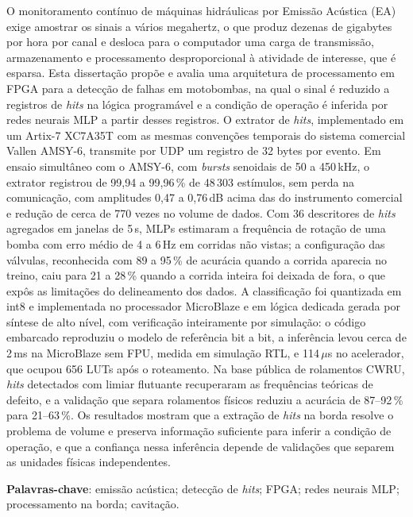 \documentclass[
	12pt,				%
	oneside,
	a4paper,			%
	english,			%
	french,				%
	spanish,			%
	brazil				%
	]{abntex2}
\begin{document}
\setlength{\absparsep}{18pt} %
\begin{resumo}
O monitoramento contínuo de máquinas hidráulicas por Emissão Acústica (EA) exige amostrar os sinais a vários megahertz, o que produz dezenas de gigabytes por hora por canal e desloca para o computador uma carga de transmissão, armazenamento e processamento desproporcional à atividade de interesse, que é esparsa. Esta dissertação propõe e avalia uma arquitetura de processamento em FPGA para a detecção de falhas em motobombas, na qual o sinal é reduzido a registros de \textit{hits} na lógica programável e a condição de operação é inferida por redes neurais MLP a partir desses registros. O extrator de \textit{hits}, implementado em um Artix-7 XC7A35T com as mesmas convenções temporais do sistema comercial Vallen AMSY-6, transmite por UDP um registro de 32 bytes por evento. Em ensaio simultâneo com o AMSY-6, com \textit{bursts} senoidais de 50 a 450\,kHz, o extrator registrou de 99,94 a 99,96\,\% de 48\,303 estímulos, sem perda na comunicação, com amplitudes 0,47 a 0,76\,dB acima das do instrumento comercial e redução de cerca de 770 vezes no volume de dados. Com 36 descritores de \textit{hits} agregados em janelas de 5\,s, MLPs estimaram a frequência de rotação de uma bomba com erro médio de 4 a 6\,Hz em corridas não vistas; a configuração das válvulas, reconhecida com 89 a 95\,\% de acurácia quando a corrida aparecia no treino, caiu para 21 a 28\,\% quando a corrida inteira foi deixada de fora, o que expôs as limitações do delineamento dos dados. A classificação foi quantizada em int8 e implementada no processador MicroBlaze e em lógica dedicada gerada por síntese de alto nível, com verificação inteiramente por simulação: o código embarcado reproduziu o modelo de referência bit a bit, a inferência levou cerca de 2\,ms na MicroBlaze sem FPU, medida em simulação RTL, e 114\,\(\mu\)s no acelerador, que ocupou 656 LUTs após o roteamento. Na base pública de rolamentos CWRU, \textit{hits} detectados com limiar flutuante recuperaram as frequências teóricas de defeito, e a validação que separa rolamentos físicos reduziu a acurácia de 87--92\,\% para 21--63\,\%. Os resultados mostram que a extração de \textit{hits} na borda resolve o problema de volume e preserva informação suficiente para inferir a condição de operação, e que a confiança nessa inferência depende de validações que separem as unidades físicas independentes.

\textbf{Palavras-chave}: emissão acústica; detecção de \textit{hits}; FPGA; redes neurais MLP; processamento na borda; cavitação.
\end{resumo}
\end{document}
